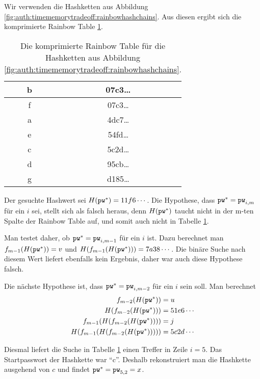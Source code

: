 \begin{beispiel} 
  Wir verwenden die Hashketten aus Abbildung
  \ref{fig:auth:timememorytradeoff:rainbowhashchains}. Aus diesen ergibt
  sich die komprimierte Rainbow Table \ref{table:auth:rainbowtable}.
  
  \begin{table}[h!]
    \begin{center}
      \begin{tabular}{|c|c|} \hline 
        b & 07c3\ldots\\\hline 
        f & 07c3\ldots\\\hline 
        a & 4dc7\ldots\\\hline 
        e & 54fd\ldots\\\hline 
        c & 5c2d\ldots\\\hline 
        d & 95cb\ldots\\\hline 
        g & d185\ldots\\\hline
      \end{tabular}
    \end{center}
    \caption{Die komprimierte Rainbow Table für die Hashketten aus
      Abbildung \ref{fig:auth:timememorytradeoff:rainbowhashchains}.}
    \label{table:auth:rainbowtable}
  \end{table}

  Der gesuchte Hashwert sei $H(\texttt{pw}^*) = 11f6\cdots$.
  Die Hypothese, dass $\texttt{pw}^* = \texttt{pw}_{i,m}$ für ein $i$ sei, stellt sich als
  falsch heraus, denn $H(\texttt{pw}^*)$ taucht nicht in der m-ten Spalte der
  Rainbow Table auf, und somit auch nicht in Tabelle
  \ref{table:auth:rainbowtable}. 
  
  Man testet daher, ob $\texttt{pw}^* = \texttt{pw}_{i,m-1}$ für ein $i$ ist. Dazu
  berechnet man $f_{m-1}(H(\texttt{pw}^*)) = v$ und $H(f_{m-1}(H(\texttt{pw}^*))) =
  7a38\cdots$. Die binäre Suche nach diesem Wert liefert ebenfalls kein
  Ergebnis, daher war auch diese Hypothese falsch.
  
  Die nächste Hypothese ist, dass $\texttt{pw}^* = \texttt{pw}_{i,m-2}$ für ein
  $i$ sein soll.  Man berechnet 
  \begin{align*}
    f_{m-2}(H(\texttt{pw}^*))               &= u\\
    H(f_{m-2}(H(\texttt{pw}^*)))            &= 51e6\cdots\\
    f_{m-1}(H(f_{m-2}(H(\texttt{pw}^*))))    &= j\\
    H(f_{m-1}(H(f_{m-2}(H(\texttt{pw}^*))))) &= 5c2d\cdots  
  \end{align*}

  Diesmal liefert die Suche in Tabelle \ref{table:auth:rainbowtable}
  einen Treffer in Zeile $i = 5$. Das Startpasswort der Hashkette war
  "`c"'. Deshalb rekonstruiert man die Hashkette ausgehend von $c$ und
  findet $\texttt{pw}^* = \texttt{pw}_{5,2} = x$.
\end{beispiel}

